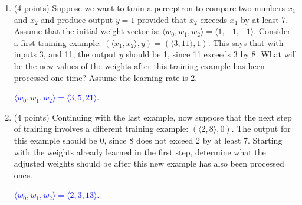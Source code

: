 \documentclass[12pt]{article}
\newenvironment{qparts}{\begin{enumerate}[{(}a{)}]}{\end{enumerate}}
\begin{document}
\begin{qparts}
  \item (4 points) Suppose we want to train a perceptron to compare two numbers $x_1$ and $x_2$ and produce output $y=1$ provided that $x_2$ exceeds $x_1$ by at least 7.
  Assume that the initial weight vector is: $\langle w_0, w_1, w_2\rangle = \langle 1, -1, -1 \rangle$.
  Consider a first training example: $(\langle x_1, x_2 \rangle, y) = (\langle 3, 11 \rangle, 1)$.  This says that with inputs 3, and 11, the output $y$ should be 1, since 11 exceeds 3 by 8.
  What will be the new values of the weights after this training example has been processed one time?  Assume the learning rate is 2.
  \vspace{1.0cm}

  \textcolor{blue}{$\langle w_0, w_1, w_2\rangle = \langle 3, 5, 21 \rangle$.}

  \item (4 points) Continuing with the last example, now suppose that the next step of training involves a different training example:
  $(\langle 2, 8 \rangle, 0)$.  The output for this example should be 0,  since 8 does not exceed 2 by at least 7.
  Starting with the weights already learned in the first step,
  determine what the adjusted weights should be after this new example has also been processed
  once.

  \textcolor{blue}{$\langle w_0, w_1, w_2\rangle = \langle 2, 3, 13 \rangle$.}


\end{qparts}
\end{document}
